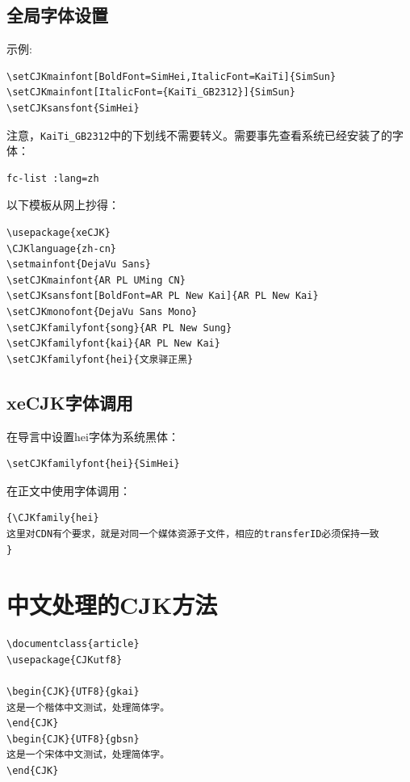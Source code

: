 \subsection{全局字体设置}
示例:
\begin{verbatim}
\setCJKmainfont[BoldFont=SimHei,ItalicFont=KaiTi]{SimSun}
\setCJKmainfont[ItalicFont={KaiTi_GB2312}]{SimSun}
\setCJKsansfont{SimHei}
\end{verbatim}
注意，\verb+KaiTi_GB2312+中的下划线不需要转义。需要事先查看系统已经安装了的字体：
\begin{verbatim}
fc-list :lang=zh
\end{verbatim}
以下模板从网上抄得：
\begin{verbatim}
\usepackage{xeCJK}
\CJKlanguage{zh-cn}
\setmainfont{DejaVu Sans}
\setCJKmainfont{AR PL UMing CN}
\setCJKsansfont[BoldFont=AR PL New Kai]{AR PL New Kai}
\setCJKmonofont{DejaVu Sans Mono}
\setCJKfamilyfont{song}{AR PL New Sung}
\setCJKfamilyfont{kai}{AR PL New Kai}
\setCJKfamilyfont{hei}{文泉驿正黑}
\end{verbatim}

\subsection{xeCJK字体调用}
在导言中设置hei字体为系统黑体：
\begin{verbatim}
\setCJKfamilyfont{hei}{SimHei}
\end{verbatim}
在正文中使用字体调用：
\begin{verbatim}
{\CJKfamily{hei}
这里对CDN有个要求，就是对同一个媒体资源子文件，相应的transferID必须保持一致
}
\end{verbatim}






\section{中文处理的CJK方法}
\label{sec:zhCJK}

\begin{verbatim}
\documentclass{article}
\usepackage{CJKutf8}

\begin{CJK}{UTF8}{gkai}
这是一个楷体中文测试，处理简体字。
\end{CJK}
\begin{CJK}{UTF8}{gbsn}
这是一个宋体中文测试，处理简体字。
\end{CJK}

\end{verbatim}

